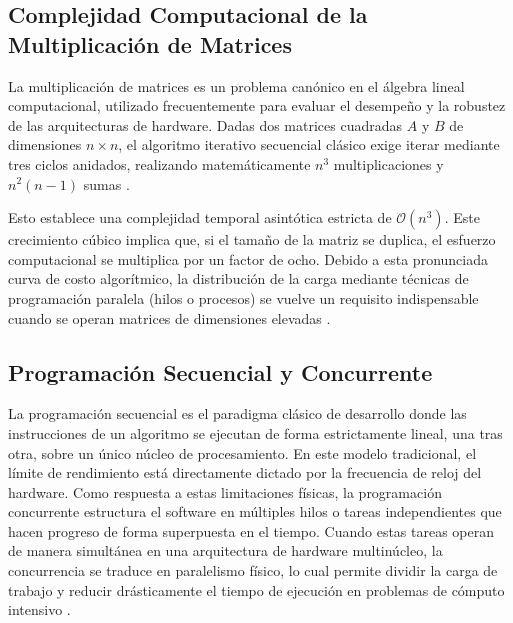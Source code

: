\subsection{Complejidad Computacional de la Multiplicación de Matrices}
La multiplicación de matrices es un problema canónico en el álgebra lineal computacional, utilizado frecuentemente para evaluar el desempeño y la robustez de las arquitecturas de hardware. Dadas dos matrices cuadradas \(A\) y \(B\) de dimensiones \(n \times n\), el algoritmo iterativo secuencial clásico exige iterar mediante tres ciclos anidados, realizando matemáticamente \(n^3\) multiplicaciones y \(n^2(n-1)\) sumas \parencite{Cormen2009Algorithms}. 

Esto establece una complejidad temporal asintótica estricta de \(\mathcal{O}(n^3)\). Este crecimiento cúbico implica que, si el tamaño de la matriz se duplica, el esfuerzo computacional se multiplica por un factor de ocho. Debido a esta pronunciada curva de costo algorítmico, la distribución de la carga mediante técnicas de programación paralela (hilos o procesos) se vuelve un requisito indispensable cuando se operan matrices de dimensiones elevadas \parencite{Grama2003Introduction}.

\subsection{Programación Secuencial y Concurrente}
La programación secuencial es el paradigma clásico de desarrollo donde las instrucciones de un algoritmo se ejecutan de forma estrictamente lineal, una tras otra, sobre un único núcleo de procesamiento. En este modelo tradicional, el límite de rendimiento está directamente dictado por la frecuencia de reloj del hardware. Como respuesta a estas limitaciones físicas, la programación concurrente estructura el software en múltiples hilos o tareas independientes que hacen progreso de forma superpuesta en el tiempo. Cuando estas tareas operan de manera simultánea en una arquitectura de hardware multinúcleo, la concurrencia se traduce en paralelismo físico, lo cual permite dividir la carga de trabajo y reducir drásticamente el tiempo de ejecución en problemas de cómputo intensivo \parencite{BenAri2006Concurrent}.

